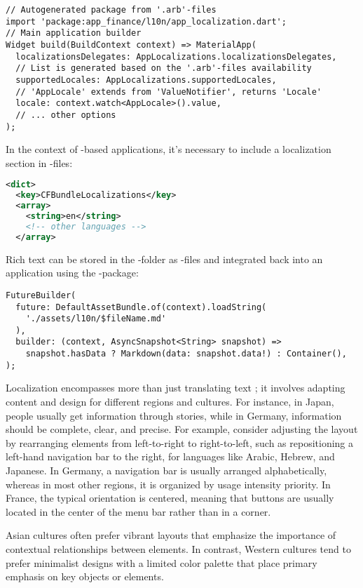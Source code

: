 \begin{lstlisting}
// Autogenerated package from '.arb'-files
import 'package:app_finance/l10n/app_localization.dart';
// Main application builder
Widget build(BuildContext context) => MaterialApp(
  localizationsDelegates: AppLocalizations.localizationsDelegates,
  // List is generated based on the '.arb'-files availability
  supportedLocales: AppLocalizations.supportedLocales,
  // 'AppLocale' extends from 'ValueNotifier', returns 'Locale'
  locale: context.watch<AppLocale>().value,
  // ... other options
);
\end{lstlisting}

\noindent In the context of -based applications, it's necessary to include a localization section in 
-files:

\begin{lstlisting}[language=xml]
<dict>
  <key>CFBundleLocalizations</key>
  <array>
    <string>en</string>
    <!-- other languages -->
  </array>
\end{lstlisting}

\noindent Rich text can be stored in the -folder as -files and integrated back into an application 
using the -package:

\begin{lstlisting}
FutureBuilder(
  future: DefaultAssetBundle.of(context).loadString(
    './assets/l10n/$fileName.md'
  ),
  builder: (context, AsyncSnapshot<String> snapshot) =>
    snapshot.hasData ? Markdown(data: snapshot.data!) : Container(),
);
\end{lstlisting}

\noindent Localization encompasses more than just translating text \cite{Hofs03}; it involves adapting content and 
design for different regions and cultures. For instance, in Japan, people usually get information through stories, while 
in Germany, information should be complete, clear, and precise. For example, consider adjusting the layout by 
rearranging elements from left-to-right to right-to-left, such as repositioning a left-hand navigation bar to the right, 
for languages like Arabic, Hebrew, and Japanese. In Germany, a navigation bar is usually arranged alphabetically, 
whereas in most other regions, it is organized by usage intensity priority. In France, the typical orientation is 
centered, meaning that buttons are usually located in the center of the menu bar rather than in a corner.

Asian cultures often prefer vibrant layouts that emphasize the importance of contextual relationships between elements. 
In contrast, Western cultures tend to prefer minimalist designs with a limited color palette that place primary emphasis 
on key objects or elements.

